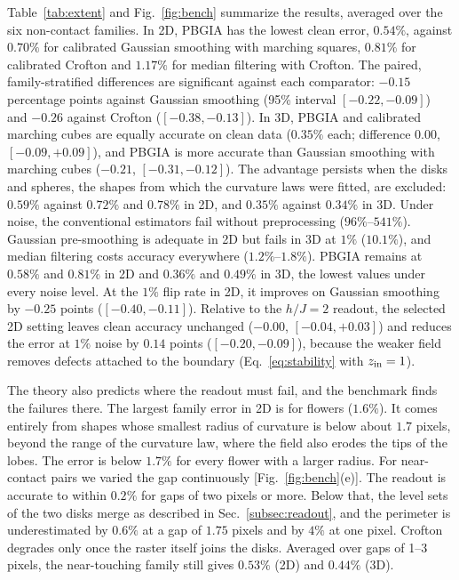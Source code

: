 \documentclass[11pt,a4paper]{article}
\begin{document}
Table~\ref{tab:extent} and Fig.~\ref{fig:bench} summarize the results, averaged over the six non-contact families. In 2D, PBGIA has the lowest clean error, $0.54\%$, against $0.70\%$ for calibrated Gaussian smoothing with marching squares, $0.81\%$ for calibrated Crofton and $1.17\%$ for median filtering with Crofton. The paired, family-stratified differences are significant against each comparator: $-0.15$ percentage points against Gaussian smoothing (95\% interval $[-0.22,-0.09]$) and $-0.26$ against Crofton ($[-0.38,-0.13]$). In 3D, PBGIA and calibrated marching cubes are equally accurate on clean data ($0.35\%$ each; difference $0.00$, $[-0.09,+0.09]$), and PBGIA is more accurate than Gaussian smoothing with marching cubes ($-0.21$, $[-0.31,-0.12]$). The advantage persists when the disks and spheres, the shapes from which the curvature laws were fitted, are excluded: $0.59\%$ against $0.72\%$ and $0.78\%$ in 2D, and $0.35\%$ against $0.34\%$ in 3D. Under noise, the conventional estimators fail without preprocessing ($96\%$--$541\%$). Gaussian pre-smoothing is adequate in 2D but fails in 3D at $1\%$ ($10.1\%$), and median filtering costs accuracy everywhere ($1.2\%$--$1.8\%$). PBGIA remains at $0.58\%$ and $0.81\%$ in 2D and $0.36\%$ and $0.49\%$ in 3D, the lowest values under every noise level. At the $1\%$ flip rate in 2D, it improves on Gaussian smoothing by $-0.25$ points ($[-0.40,-0.11]$). Relative to the $h/J=2$ readout, the selected 2D setting leaves clean accuracy unchanged ($-0.00$, $[-0.04,+0.03]$) and reduces the error at $1\%$ noise by $0.14$ points ($[-0.20,-0.09]$), because the weaker field removes defects attached to the boundary (Eq.~\eqref{eq:stability} with $z_{\rm in}=1$).

The theory also predicts where the readout must fail, and the benchmark finds the failures there. The largest family error in 2D is for flowers ($1.6\%$). It comes entirely from shapes whose smallest radius of curvature is below about $1.7$ pixels, beyond the range of the curvature law, where the field also erodes the tips of the lobes. The error is below $1.7\%$ for every flower with a larger radius. For near-contact pairs we varied the gap continuously [Fig.~\ref{fig:bench}(e)]. The readout is accurate to within $0.2\%$ for gaps of two pixels or more. Below that, the level sets of the two disks merge as described in Sec.~\ref{subsec:readout}, and the perimeter is underestimated by $0.6\%$ at a gap of $1.75$ pixels and by $4\%$ at one pixel. Crofton degrades only once the raster itself joins the disks. Averaged over gaps of 1--3 pixels, the near-touching family still gives $0.53\%$ (2D) and $0.44\%$ (3D).
\end{document}
